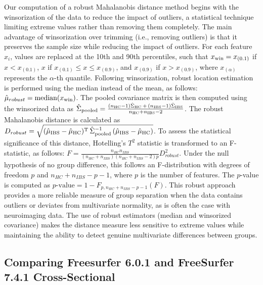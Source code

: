 \documentclass[diagnostics,article,accept,pdftex,moreauthors]{Definitions/mdpi}
\begin{document}
Our computation of a robust Mahalanobis distance method begins with the winsorization of the data to reduce the impact of outliers, a statistical technique limiting extreme values rather than removing them completely. The main advantage of winsorization over trimming (i.e., removing outliers) is that it preserves the sample size while reducing the impact of outliers. For each feature $x_i$, values are replaced at the 10th and 90th percentiles, such that $x_{\text{\scriptsize win}} = x_{(0.1)}$ if $x < x_{(0.1)}$, $x$ if $x_{(0.1)} \leq x \leq x_{(0.9)}$, and $x_{(0.9)}$ if $x > x_{(0.9)}$, where $x_{(\alpha)}$ represents the $\alpha$-th quantile. Following winsorization, robust location estimation is performed using the median instead of the mean, as follows: $\hat{\mu}_{\text \scriptsize {robust}} = \text{median}(x_{\text{\scriptsize win}})$. The pooled covariance matrix is then computed using the winsorized data as $\hat{\Sigma}_{\text{\scriptsize pooled}} = \frac{(n_{\text{\tiny HC}} - 1)\hat{\Sigma}_{\text{\tiny HC}} \, + \, (n_{\text{\tiny IBS}} - 1)\hat{\Sigma}_{\text{\tiny IBS}}}{n_{\text{\tiny HC}} + n_{\text{\tiny IBS}} - 2}$. The robust Mahalanobis distance is calculated as $D_{robust} = \sqrt{(\hat{\mu}_{{\text{\scriptsize IBS}}} - \hat{\mu}_{\text{\scriptsize HC}})^{\text{\scriptsize T}} \, \hat{\Sigma}_{\text{\scriptsize pooled}}^{-1} \,  (\hat{\mu}_{\text{\scriptsize IBS}} - \hat{\mu}_{\text{\scriptsize HC}})}$. To assess the statistical significance of this distance, Hotelling's $T^2$ statistic is transformed to an F-statistic, as follows: $F = \frac{{n_{HC}} {n_{IBS}}}{(n_{HC} + n_{IBS})(n_{HC} + n_{IBS} - 2)p}D_{robust}^2$. Under the null hypothesis of no group difference, this follows an F-distribution with degrees of freedom $p$ and $n_{HC} + n_{IBS} - p - 1$, where $p$ is the number of features. The $p$-value is computed as $p\text{-value} = 1 - F_{p,n_{HC} + n_{IBS} - p - 1}(F)$. This robust approach provides a more reliable measure of group separation when the data contains outliers or deviates from multivariate normality, as is often the case with neuroimaging data. The use of robust estimators (median and winsorized covariance) makes the distance measure less sensitive to extreme values while maintaining the ability to detect genuine multivariate differences between groups.



\subsection{Comparing Freesurfer 6.0.1 and FreeSurfer 7.4.1 Cross-Sectional } %
\end{document}
